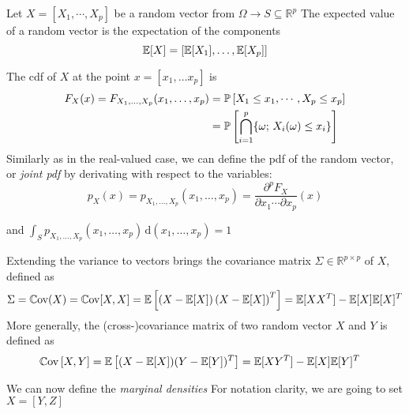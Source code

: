 \documentclass[../../Main_ManuscritThese.tex]{subfiles}
\begin{document}
\begin{definition}
 \label{def:joint_marginal_cond_densities}
 Let $X=[X_1,\cdots,X_p]$ be a random vector from $\Omega \rightarrow S\subseteq\mathbb{R}^p$
 The expected value of a random vector is the expectation of the components
 \begin{equation}
\mathbb{E}[X] = \left[\mathbb{E}[X_1],\dots,\mathbb{E}[X_p]\right]
\end{equation}

The cdf of $X$ at the point $x=[x_1,\dots x_p]$ is
   \begin{align}
     \label{eq:def_cdf_multi}
     F_{X}(x) = F_{X_1,\dots, X_p}(x_1,\dots, x_p) &= \mathbb{P}\left[X_1 \leq x_1, \cdots, X_p\leq x_p\right]\\
                                                   &= \mathbb{P}\left[\bigcap_{i=1}^p \{\omega;\,X_i(\omega) \leq x_i\}\right] \nonumber
  \end{align}
 Similarly as in the real-valued case, we can define the pdf of the random vector, or \emph{joint pdf} by derivating with respect to the variables:
  \begin{equation}
    p_{X}(x)= p_{X_1,\dots, X_p}(x_1,\dots, x_p) =\frac{\partial^p F_X}{\partial x_1 \cdots \partial x_p}(x)
  \end{equation}
  
  and $\int_{S}p_{X_1,\dots, X_p}(x_1,\dots, x_p)\,\mathrm{d}(x_1,\dots, x_p)=1$

Extending the variance to vectors brings the covariance matrix $\Sigma \in \mathbb{R}^{p\times p}$ of $X$, defined as
  \begin{equation}
    \Sigma = \mathbb{C}\mathrm{ov}(X)=\mathbb{C}\mathrm{ov}[X,X]= \mathbb{E}\left[\left(X - \mathbb{E}[X]\right)\left(X-\mathbb{E}[X]\right)^T\right] = \mathbb{E}[XX^T] - \mathbb{E}[X]\mathbb{E}[X]^T
  \end{equation}
 More generally, the (cross-)covariance matrix of two random vector $X$ and $Y$ is defined as
  \begin{align}
    \mathbb{C}\mathrm{ov}\left[X,Y\right] &= \mathbb{E}\left[(X-\mathbb{E}[X])(Y - \mathbb{E}[Y])^T\right] = \mathbb{E}[XY^T] - \mathbb{E}[X]\mathbb{E}[Y]^T
  \end{align}

  We can now define the \emph{marginal densities}
  For notation clarity, we are going to set $X = [Y,Z]$


\end{definition}
\end{document}
